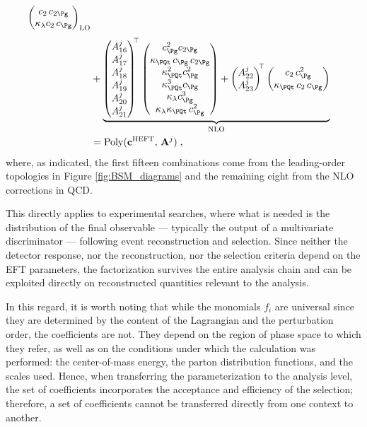 \begin{equation}
\begin{split}
{\begin{pmatrix}
c_2\, c_{2\Pg} \\
\kappa_{\lambda} c_2\, c_\Pg
\end{pmatrix}
}_{\text{LO}} \\[4pt]
&+
\underbrace{
\begin{pmatrix}
A^j_{16} \\ A^j_{17} \\ A^j_{18} \\ A^j_{19} \\ A^j_{20} \\ A^j_{21}
\end{pmatrix}^{\!\!\top}
\begin{pmatrix}
c_\Pg^2 c_{2\Pg} \\
\kappa_\PQt\, c_\Pg\, c_{2\Pg} \\
\kappa_\PQt^2 c_\Pg^2 \\
\kappa_\PQt^3 c_\Pg \\
\kappa_{\lambda} c_\Pg^3 \\
\kappa_{\lambda} \kappa_\PQt\, c_\Pg^2
\end{pmatrix}
+
\begin{pmatrix}
A^j_{22} \\ A^j_{23}
\end{pmatrix}^{\!\!\top}
\begin{pmatrix}
c_2\, c_\Pg^2 \\
\kappa_\PQt\, c_2\, c_\Pg
\end{pmatrix}
}_{\text{NLO}}\\
&=\mathrm{Poly}(\mathbf{c}^{\text{HEFT}},\, \mathbf{A}^j)\;,
\end{split}
\end{equation}
%
where, as indicated, the first fifteen combinations come from the leading-order topologies in Figure \ref{fig:BSM_diagrams} and the remaining eight from the NLO corrections in QCD.


This directly applies to experimental searches, where what is needed is the distribution of the final observable — typically the output of a multivariate discriminator — following event reconstruction and selection. Since neither the detector response, nor the reconstruction, nor the selection criteria depend on the EFT parameters, the factorization survives the entire analysis chain and can be exploited directly on reconstructed quantities relevant to the analysis.

In this regard, it is worth noting that while the monomials $f_i$ are universal since they are determined by the content of the Lagrangian and the perturbation order, the coefficients are not. They depend on the region of phase space to which they refer, as well as on the conditions under which the calculation was performed: the center-of-mass energy, the parton distribution functions, and the scales used. Hence, when transferring the parameterization to the analysis level, the set of coefficients incorporates the acceptance and efficiency of the selection; therefore, a set of coefficients cannot be transferred directly from one context to another.\\

